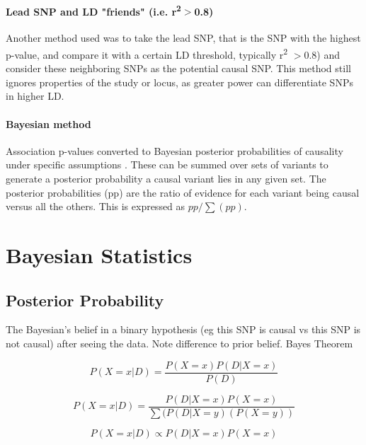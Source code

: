 \paragraph{Lead SNP and LD  "friends" (i.e. r\textsuperscript{2}$>$0.8)}

Another method used was to take the lead SNP, that is the SNP with the highest p-value, and compare it with a certain LD threshold, typically r\textsuperscript{2}	$>$0.8) and consider these neighboring SNPs as the potential causal SNP. This method still ignores properties of the study or locus, as greater power can differentiate SNPs in higher LD. 

\paragraph{Bayesian method}

Association p-values converted to Bayesian posterior probabilities of causality under specific assumptions \cite{Stephens2009} \cite{Wakefield2007}.  These can be summed over sets of variants to generate a posterior probability a causal variant lies in any given set. The posterior probabilities (pp) are the ratio of evidence for each variant being causal versus all the others. This is expressed as $pp/\sum(pp)$. 


\section{Bayesian Statistics}
\subsection{Posterior Probability}
The Bayesian's belief in a binary hypothesis (eg this SNP is causal vs this SNP is not causal) after seeing the data.  Note difference to prior belief.  Bayes Theorem

\begin{equation}
\label{eq-Bayes Theorem}
P(X=x|D)
= \frac{P(X=x) P(D|X=x)}{P(D)}
\end{equation}

\begin{equation}
\label{eq-Bayes Theorem}
{P(X=x|D)}
 = \frac{P(D|X=x) P(X=x)}{\sum(P(D|X=y)(P(X=y))}
\end{equation}

\begin{equation}
\label{eq-Bayes Theorem}
{P(X=x|D)}
 \propto {P(D|X=x) P(X=x)}
\end{equation}


